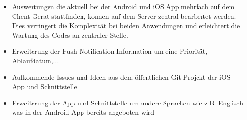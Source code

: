 \begin{itemize}
\item Auswertungen die aktuell bei der Android und iOS App mehrfach auf dem Client Gerät stattfinden, können auf dem Server zentral bearbeitet werden. Dies verringert die Komplexität bei beiden Anwendungen und erleichtert die Wartung des Codes an zentraler Stelle.
\item Erweiterung der Push Notification Information um eine Priorität, Ablaufdatum,...
\item Aufkommende Issues und Ideen aus dem öffentlichen Git Projekt der iOS App und Schnittstelle
\item Erweiterung der App und Schnittstelle um andere Sprachen wie z.B. Englisch was in der Android App bereits angeboten wird

\end{itemize}


